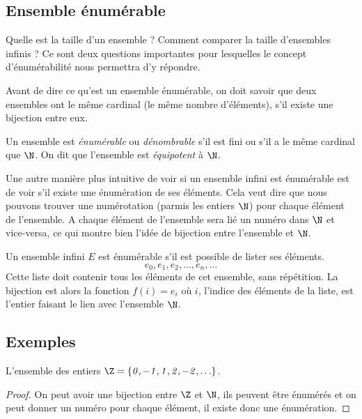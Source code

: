 \begin{myexem}

\section{Ensemble énumérable}
\label{sec:ensemble_num_rables}
Quelle est la taille d'un ensemble ?  Comment comparer la taille d'ensembles infinis ? Ce sont deux questions importantes pour lesquelles le concept d'énumérabilité nous permettra d'y répondre.

Avant de dire ce qu'est un ensemble énumérable, on doit savoir que deux ensembles
ont le même cardinal (le même nombre d'éléments), s'il existe une bijection entre eux.

\begin{mydef}
	Un ensemble est \emph{énumérable} ou \emph{dénombrable} s'il est fini ou s'il a le même cardinal que $\N$. On dit que l'ensemble est \emph{équipotent} à $\N$.
\end{mydef}
Une autre manière plus intuitive de voir si un ensemble infini est énumérable est de voir s'il existe une énumération de ses éléments. Cela veut dire que nous pouvons trouver une numérotation (parmis les entiers $\N$) pour chaque élément de l'ensemble. A chaque élément de l'ensemble sera lié un numéro dans $\N$ et vice-versa, ce qui montre bien l'idée de bijection entre l'ensemble et $\N$.

\begin{myprop}
Un ensemble infini $E$ est énumérable s'il est possible de lister ses éléments.
\[
e_0, e_1, e_2, \ldots , e_n, \ldots
\]
Cette liste doit contenir tous les éléments de cet ensemble, sans répétition.  La bijection est alors la fonction $f(i) = e_i$ où $i$, l'indice des éléments de la liste, est l'entier faisant le lien avec l'ensemble $\N$.
\end{myprop}

\subsection{Exemples}
\label{subsec:exemples}

\begin{myexem}
  L'ensemble des entiers $\mathit{\Z=\{0,-1,1,2,-2,\ldots\}}$.
  \begin{proof}
     On peut avoir une bijection entre $\Z$ et $\N$, ils peuvent être énumérés et on peut donner un numéro pour chaque élément, il existe donc une énumération.


\end{proof}
\end{myexem}
\end{myexem}
